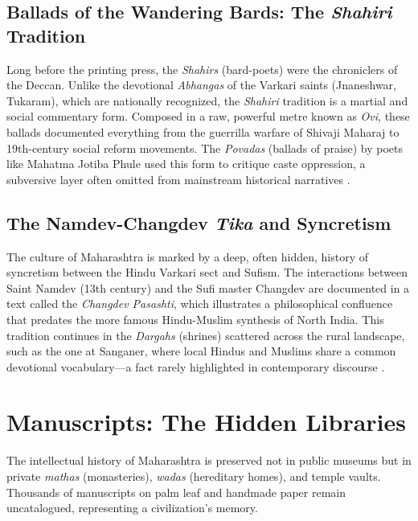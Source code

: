 \documentclass{article}
\begin{document}
\subsection{Ballads of the Wandering Bards: The \textit{Shahiri} Tradition}
Long before the printing press, the \textit{Shahirs} (bard-poets) were the chroniclers of the Deccan. Unlike the devotional \textit{Abhangas} of the Varkari saints (Jnaneshwar, Tukaram), which are nationally recognized, the \textit{Shahiri} tradition is a martial and social commentary form. Composed in a raw, powerful metre known as \textit{Ovi}, these ballads documented everything from the guerrilla warfare of Shivaji Maharaj to 19th-century social reform movements. The \textit{Povadas} (ballads of praise) by poets like Mahatma Jotiba Phule used this form to critique caste oppression, a subversive layer often omitted from mainstream historical narratives \cite{phule}.

\subsection{The Namdev-Changdev \textit{Tika} and Syncretism}
The culture of Maharashtra is marked by a deep, often hidden, history of syncretism between the Hindu Varkari sect and Sufism. The interactions between Saint Namdev (13th century) and the Sufi master Changdev are documented in a text called the \textit{Changdev Pasashti}, which illustrates a philosophical confluence that predates the more famous Hindu-Muslim synthesis of North India. This tradition continues in the \textit{Dargahs} (shrines) scattered across the rural landscape, such as the one at Sanganer, where local Hindus and Muslims share a common devotional vocabulary—a fact rarely highlighted in contemporary discourse \cite{novetzke}.

\section{Manuscripts: The Hidden Libraries}
The intellectual history of Maharashtra is preserved not in public museums but in private \textit{mathas} (monasteries), \textit{wadas} (hereditary homes), and temple vaults. Thousands of manuscripts on palm leaf and handmade paper remain uncatalogued, representing a civilization's memory.
\end{document}
